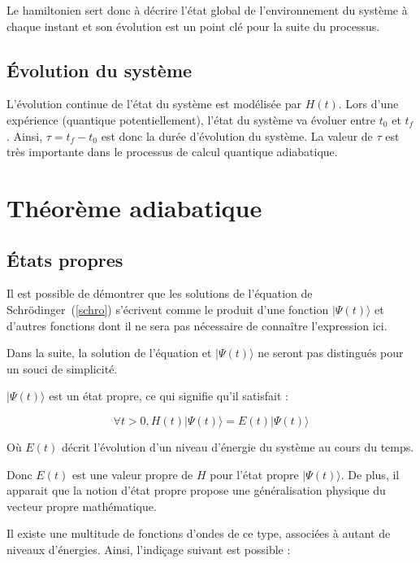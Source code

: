 \documentclass{article}
\begin{document}
\medskip

\noindent Le hamiltonien sert donc à décrire l'état global de l'environnement du système à chaque instant et son évolution est un point clé pour la suite du processus. \cite{wiki2023hamiltonian}

\subsection{Évolution du système}

L'évolution continue de l'état du système est modélisée par $H(t)$. Lors d'une expérience (quantique potentiellement), l'état du système va évoluer entre $t_0$ et $t_f$. Ainsi, $\tau = t_f - t_0$ est donc la durée d'évolution du système. La valeur de $\tau$ est très importante dans le processus de calcul quantique adiabatique.

\section{Théorème adiabatique}

\subsection{États propres}

Il est possible de démontrer que les solutions de l'équation de Schrödinger~(\ref{schro}) s'écrivent comme le produit d'une fonction $|\Psi(t)\rangle$ et d'autres fonctions dont il ne sera pas nécessaire de connaître l'expression ici.

\medskip

\noindent Dans la suite, la solution de l'équation et $|\Psi(t)\rangle$ ne seront pas distingués pour un souci de simplicité.

\medskip

$|\Psi(t)\rangle$ est un état propre, ce qui signifie qu'il satisfait :  

$$\forall t>0, H(t)|\Psi(t)\rangle=E(t)|\Psi(t)\rangle$$

Où $E(t)$ décrit l'évolution d'un niveau d'énergie du système au cours du temps.

\medskip

\noindent Donc $E(t)$ est une valeur propre de $H$ pour l'état propre $|\Psi(t)\rangle$. De plus, il apparait que la notion d'état propre propose une généralisation physique du vecteur propre mathématique.

\medskip

\noindent Il existe une multitude de fonctions d'ondes de ce type, associées à autant de niveaux d'énergies. Ainsi, l'indiçage suivant est possible :
\end{document}
